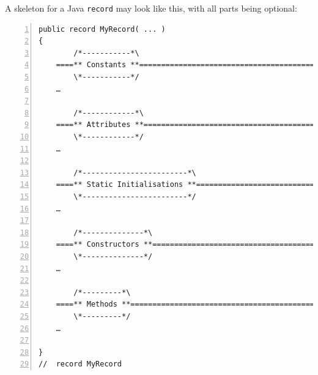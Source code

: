 \documentclass[12pt,a4paper,titlepage, parskip=half, headsepline, footsepline, cleardoubleplain]{scrbook}
\begin{document}
A skeleton for a Java \lstinline|record| may look like this, with all parts being optional:
\begin{lstlisting}[numbers=left,caption={Record Skeleton}]
public record MyRecord( ... ) 
{
        /*-----------*\
    ====** Constants **==============================================
        \*-----------*/
    …
        
        /*------------*\
    ====** Attributes **=============================================
        \*------------*/
    …
        
        /*------------------------*\
    ====** Static Initialisations **=================================
        \*------------------------*/
    …
        
        /*--------------*\
    ====** Constructors **===========================================
        \*--------------*/
    …
        
        /*---------*\
    ====** Methods **================================================
        \*---------*/
    …
                
}
//  record MyRecord
\end{lstlisting}
 
\end{document}
